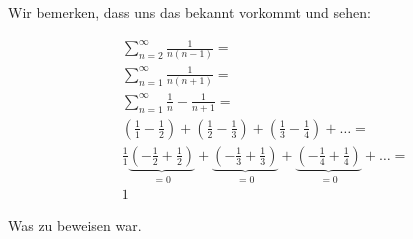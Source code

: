 \documentclass[a4paper,german,12pt,smallheadings]{scrartcl}
\begin{document}
Wir bemerken, dass uns das bekannt vorkommt und sehen:

\begin{align*}
  &\sum_{n=2}^\infty \frac{1}{n(n-1)} =\\
  &\sum_{n=1}^\infty \frac{1}{n(n+1)} =\\
  &\sum_{n=1}^\infty \frac{1}{n} - \frac{1}{n+1} =\\
  &\left(\frac{1}{1} - \frac{1}{2}\right) + \left(\frac{1}{2} - \frac{1}{3}\right) + \left(\frac{1}{3} - \frac{1}{4}\right) + \dots = \\
  &\frac{1}{1}  \underbrace{\left(-\frac{1}{2} + \frac{1}{2}\right)}_{=0} + \underbrace{\left(-\frac{1}{3} + \frac{1}{3}\right)}_{=0} + \underbrace{\left(-\frac{1}{4} + \frac{1}{4}\right)}_{=0} + \dots = \\
  &1
\end{align*}

Was zu beweisen war.
\end{document}
